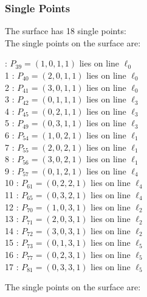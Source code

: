 \documentclass{article}
\begin{document}
{\subsubsection*{Single Points}
The surface has 18 single points:\\
The single points on the surface are:\\
\begin{multicols}{2}
 : $P_{39}=( 1, 0, 1, 1 )$ lies on line $\ell_{0}$\\
1 : $P_{40}=( 2, 0, 1, 1 )$ lies on line $\ell_{0}$\\
2 : $P_{41}=( 3, 0, 1, 1 )$ lies on line $\ell_{0}$\\
3 : $P_{42}=( 0, 1, 1, 1 )$ lies on line $\ell_{3}$\\
4 : $P_{45}=( 0, 2, 1, 1 )$ lies on line $\ell_{3}$\\
5 : $P_{49}=( 0, 3, 1, 1 )$ lies on line $\ell_{3}$\\
6 : $P_{54}=( 1, 0, 2, 1 )$ lies on line $\ell_{1}$\\
7 : $P_{55}=( 2, 0, 2, 1 )$ lies on line $\ell_{1}$\\
8 : $P_{56}=( 3, 0, 2, 1 )$ lies on line $\ell_{1}$\\
9 : $P_{57}=( 0, 1, 2, 1 )$ lies on line $\ell_{4}$\\
10 : $P_{61}=( 0, 2, 2, 1 )$ lies on line $\ell_{4}$\\
11 : $P_{65}=( 0, 3, 2, 1 )$ lies on line $\ell_{4}$\\
12 : $P_{70}=( 1, 0, 3, 1 )$ lies on line $\ell_{2}$\\
13 : $P_{71}=( 2, 0, 3, 1 )$ lies on line $\ell_{2}$\\
14 : $P_{72}=( 3, 0, 3, 1 )$ lies on line $\ell_{2}$\\
15 : $P_{73}=( 0, 1, 3, 1 )$ lies on line $\ell_{5}$\\
16 : $P_{77}=( 0, 2, 3, 1 )$ lies on line $\ell_{5}$\\
17 : $P_{81}=( 0, 3, 3, 1 )$ lies on line $\ell_{5}$\\
\end{multicols}
The single points on the surface are:\\
}
\end{document}
